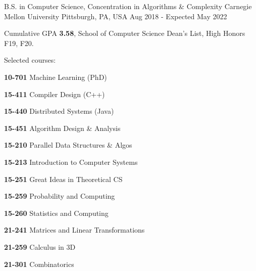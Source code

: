 

\begin{cventries}

  \eduentry
    {B.S. in Computer Science, Concentration in Algorithms \& Complexity} %
    {Carnegie Mellon University} %
    {Pittsburgh, PA, USA} %
    {Aug 2018 - Expected May 2022} %
    {
      \begin{cvitems} %
      \item {Cumulative GPA \textbf{3.58}, School of Computer Science Dean's List, High Honors F19, F20. }
      \item {Selected courses:}
        \setlength\multicolsep{0pt}
        \begin{multicols}{3}
          \item[] {\textbf{10-701} Machine Learning (PhD)}
          \item[] {\textbf{15-411} Compiler Design (C++)}
          \item[] {\textbf{15-440} Distributed Systems (Java)}
          \item[] {\textbf{15-451} Algorithm Design \& Analysis}
          \item[] {\textbf{15-210} Parallel Data Structures \& Algos}
          \item[] {\textbf{15-213} Introduction to Computer Systems}
          \item[] {\textbf{15-251} Great Ideas in Theoretical CS}
          \item[] {\textbf{15-259} Probability and Computing}
          \item[] {\textbf{15-260} Statistics and Computing}
          \item[] {\textbf{21-241} Matrices and Linear Transformations}
          \item[] {\textbf{21-259} Calculus in 3D}
          \item[] {\textbf{21-301} Combinatorics}
        \end{multicols}
      \end{cvitems}
    }
\end{cventries}
